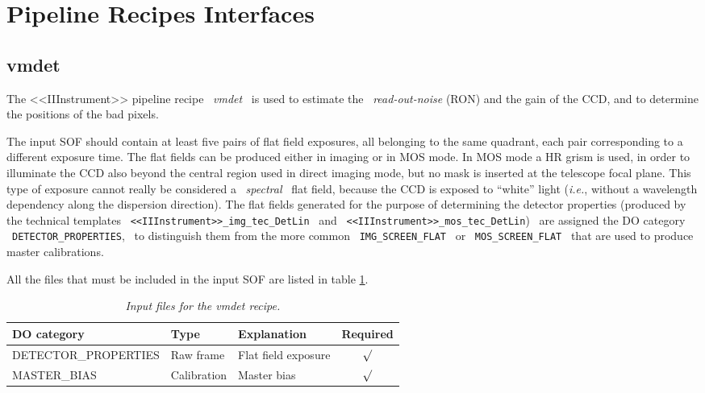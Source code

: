 
\section{Pipeline Recipes Interfaces} 

\subsection{vmdet}
\label{sec:UVMDET}

The <<IIInstrument>> pipeline recipe \ {\it vmdet} \ is used to estimate the 
\ {\it read-out-noise} (RON) and the gain of the CCD, and to 
determine the positions of the bad pixels.

The input SOF should contain at least five pairs of flat field exposures,
all belonging to the same quadrant, each pair corresponding to a different 
exposure time. The flat fields can be produced either in imaging 
or in MOS mode. In MOS mode a HR grism is used, in order to 
illuminate the CCD also beyond the central region used in direct 
imaging mode, but no mask is inserted at the telescope focal plane. 
This type of exposure cannot really be considered a \ {\it spectral} 
\ flat field, because the CCD is exposed to ``white'' light ({\it i.e.}, 
without a wavelength dependency along the dispersion direction). The flat 
fields generated for the purpose of determining the detector properties 
(produced by the technical templates \ {\tt <<IIInstrument>>\_img\_tec\_DetLin} 
\ and \ {\tt <<IIInstrument>>\_mos\_tec\_DetLin}) \ are assigned the DO category 
\ {\tt DETECTOR\_PROPERTIES}, \ to distinguish them from the more common 
\ {\tt IMG\_SCREEN\_FLAT} \ or \ {\tt MOS\_SCREEN\_FLAT} \ that are 
used to produce master calibrations.

All the files that must be included in the input SOF are listed in table 
\ref{tab:IVMDET}.

\begin{table}[h]
  \begin{center}
    \begin{tabular}{|l|l|l|c|}
    \hline
      {\bf DO category} & {\bf Type} & {\bf Explanation} & {\bf Required} \\
    \hline 
      DETECTOR\_PROPERTIES   & Raw frame   & Flat field exposure   & $\surd$ \\
      MASTER\_BIAS           & Calibration & Master bias           & $\surd$ \\
    \hline
    \end{tabular}
    \caption{\it Input files for the vmdet recipe.}
    \label{tab:IVMDET}
  \end{center}
\end{table}

